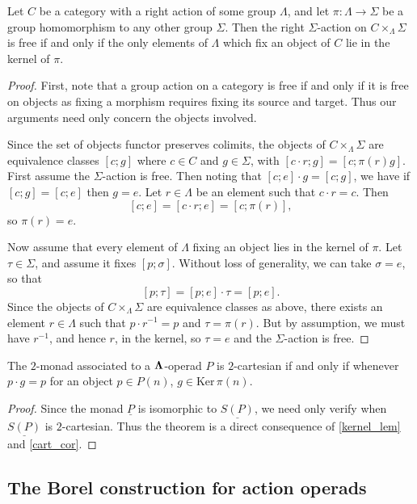 \begin{lem}\label{kernel_lem}
Let $C$ be a category with a right action of some group $\Lambda$, and let $\pi \colon  \Lambda \rightarrow \Sigma$ be a group homomorphism to any other group $\Sigma$. Then the right $\Sigma$-action on $C \times_{\Lambda} \Sigma$ is free if and only if the only elements of $\Lambda$ which fix an object of $C$ lie in the kernel of $\pi$.
\end{lem}
\begin{proof}
First, note that a group action on a category is free if and only if it is free on objects as fixing a morphism requires fixing its source and target. Thus our arguments need only concern the objects involved.

Since the set of objects functor preserves colimits, the objects of $C \times_{\Lambda} \Sigma$ are equivalence classes $[c;g]$ where $c \in C$ and $g \in \Sigma$, with $[c\cdot r;g] = [c; \pi(r)g]$. First assume the $\Sigma$-action is free. Then noting that $[c;e]\cdot g =[c;g]$, we have if $[c;g] = [c;e]$ then $g=e$. Let $r \in \Lambda$ be an element such that $c\cdot r = c$. Then
  \[
    [c;e] = [c\cdot r; e] = [c; \pi(r)],
  \]
so $\pi(r) = e$.

Now assume that every element of $\Lambda$ fixing an object lies in the kernel of $\pi$. Let $\tau \in \Sigma$, and assume it fixes $[p; \sigma]$. Without loss of generality, we can take $\sigma = e$, so that
  \[
    [p; \tau] = [p;e]\cdot \tau = [p;e].
  \]
Since the objects of $C \times_{\Lambda} \Sigma$ are equivalence classes as above, there exists an element $r \in \Lambda$ such that $p\cdot r^{-1} = p$ and $\tau = \pi(r)$. But by assumption, we must have $r^{-1}$, and hence $r$, in the kernel, so $\tau = e$ and the $\Sigma$-action is free.
\end{proof}

\begin{thm}\label{cart_thm}
The $2$-monad associated to a $\mathbf{\Lambda}$-operad $P$ is $2$-cartesian if and only if whenever $p \cdot g = p$ for an object $p \in P(n)$, $g \in \textrm{Ker} \, \pi (n)$.
\end{thm}
\begin{proof}
Since the monad $\underline{P}$ is isomorphic to $\underline{S(P)}$, we need only verify when $\underline{S(P)}$ is $2$-cartesian. Thus the theorem is a direct consequence of \cref{kernel_lem} and \cref{cart_cor}.
\end{proof}

\subsection{The Borel construction for action operads}


